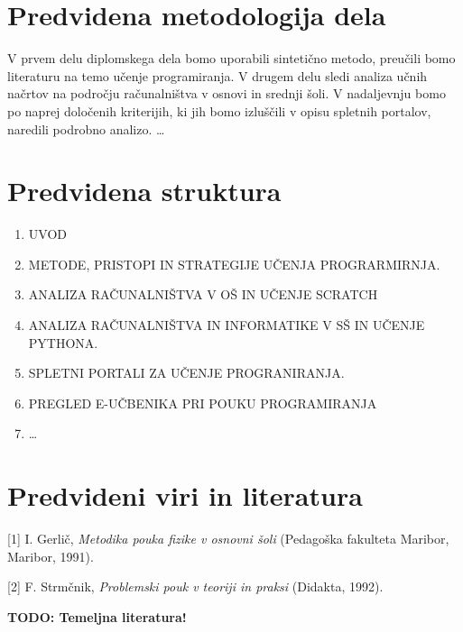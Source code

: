 \section{Predvidena metodologija dela}
\label{sec:metodologija_dela}

V prvem delu diplomskega dela bomo uporabili sintetično metodo,
preučili bomo literaturu na temo učenje programiranja. V drugem delu
sledi analiza učnih načrtov na področju računalništva v osnovi in
srednji šoli. V nadaljevnju bomo po naprej določenih kriterijih, ki
jih bomo izluščili v opisu spletnih portalov, naredili podrobno
analizo. \dots

\section{Predvidena struktura}
\label{sec:predvidena_struktura}

\begin{enumerate}
\item UVOD
\item METODE, PRISTOPI IN STRATEGIJE UČENJA PROGRARMIRNJA.
\item ANALIZA RAČUNALNIŠTVA V OŠ IN UČENJE SCRATCH
\item ANALIZA RAČUNALNIŠTVA IN INFORMATIKE V SŠ IN UČENJE PYTHONA.
\item SPLETNI PORTALI ZA UČENJE PROGRANIRANJA.
\item PREGLED E-UČBENIKA PRI POUKU PROGRAMIRANJA
\item \dots
\end{enumerate}


\section{Predvideni viri in literatura}
\label{sec:viri_in_literatura}

[1] I. Gerlič, \emph{Metodika pouka fizike v osnovni šoli} (Pedagoška
fakulteta Maribor, Maribor, 1991).

[2] F. Strmčnik, \emph{Problemski pouk v teoriji in praksi} (Didakta,
1992).

\textbf{TODO: Temeljna literatura!}
